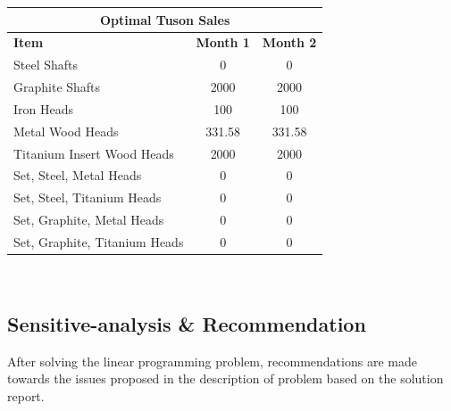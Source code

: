 \documentclass[12pt]{article}
\begin{document}
\noindent
\begin{center}
\begin{tabular}{ l c c }
\hline
\multicolumn{3}{c}{Optimal Tuson Sales} \\
\hline
\textbf{Item} & \textbf{Month 1} & \textbf{Month 2} \\
Steel Shafts & 0 & 0 \\
Graphite Shafts & 2000 & 2000 \\
Iron Heads & 100 & 100 \\
Metal Wood Heads & 331.58 & 331.58 \\
Titanium Insert Wood Heads & 2000 & 2000 \\
Set, Steel, Metal Heads & 0 & 0 \\
Set, Steel, Titanium Heads & 0 & 0 \\
Set, Graphite, Metal Heads & 0 & 0 \\
Set, Graphite, Titanium Heads & 0 & 0 \\
\hline
\end{tabular}
\vspace{5mm}
\\
\end{center}

\subsection{Sensitive-analysis \& Recommendation}

After solving the linear programming problem, recommendations are made towards the issues proposed in the description of problem based on the solution report.
\end{document}

